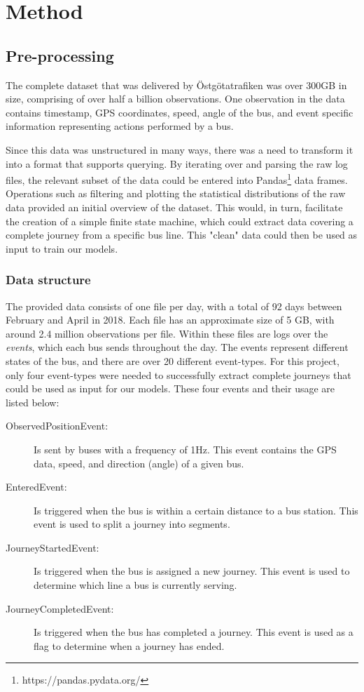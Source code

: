 
\chapter{Method}
\label{cha:method}

\section{Pre-processing}\label{pre-processing}
\label{sec:pre-processing}
The complete dataset that was delivered by Östgötatrafiken was over 300GB in size, comprising of over half a billion observations. One observation in the data contains timestamp, GPS coordinates, speed, angle of the bus, and  event specific information representing actions performed by a bus. 

Since this data was unstructured in many ways, there was a need to transform it into a format that supports querying. By iterating over and parsing the raw log files, the relevant subset of the data could be entered into Pandas\footnote{https://pandas.pydata.org/} data frames. Operations such as filtering and plotting the statistical distributions of the raw data provided an initial overview of the dataset. This would, in turn, facilitate the creation of a simple finite state machine, which could extract data covering a complete journey from a specific bus line. This "clean" data could then be used as input to train our models.

\subsection{Data structure}
The provided data consists of one file per day, with a total of 92 days between February and April in 2018. Each file has an approximate size of 5 GB, with around 2.4 million observations per file. Within these files are logs over the \textit{events}, which each bus sends throughout the day. The events represent different states of the bus, and there are over 20 different event-types. For this project, only four event-types were needed to successfully extract complete journeys that could be used as input for our models. These four events and their usage are listed below:\\
\begin{description}
\item[ObservedPositionEvent:] Is sent by buses with a frequency of 1Hz. This event contains the GPS data, speed, and direction (angle) of a given bus.
\item[EnteredEvent:] Is triggered when the bus is within a certain distance to a bus station. This event is used to split a journey into segments.
\item[JourneyStartedEvent:] Is triggered when the bus is assigned a new journey. This event is used to determine which line a bus is currently serving.
\item[JourneyCompletedEvent:] Is triggered when the bus has completed a journey. This event is used as a flag to determine when a journey has ended.
\end{description}

